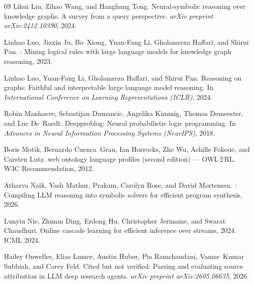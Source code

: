 \documentclass[11pt]{article}
\theoremstyle{plain}
\begin{document}
{\begin{thebibliography}{69}
Lihui Liu, Zihao Wang, and Hanghang Tong.
\newblock Neural-symbolic reasoning over knowledge graphs: A survey from a
  query perspective.
\newblock \emph{arXiv preprint arXiv:2412.10390}, 2024.

Linhao Luo, Jiaxin Ju, Bo~Xiong, Yuan-Fang Li, Gholamreza Haffari, and Shirui
  Pan.
: Mining logical rules with large language models for
  knowledge graph reasoning, 2023.

Linhao Luo, Yuan-Fang Li, Gholamreza Haffari, and Shirui Pan.
\newblock Reasoning on graphs: Faithful and interpretable large language model
  reasoning.
\newblock In \emph{International Conference on Learning Representations
  (ICLR)}, 2024.

Robin Manhaeve, Sebastijan Dumancic, Angelika Kimmig, Thomas Demeester, and Luc
  De~Raedt.
\newblock Deepproblog: Neural probabilistic logic programming.
\newblock In \emph{Advances in Neural Information Processing Systems
  (NeurIPS)}, 2018.

Boris Motik, Bernardo Cuenca~Grau, Ian Horrocks, Zhe Wu, Achille Fokoue, and
  Carsten Lutz.
 web ontology language profiles (second edition) ---
  {OWL\,2\,RL}.
\newblock W3C Recommendation, 2012.

Atharva Naik, Yash Mathur, {Prakam}, Carolyn Rose, and David Mortensen.
: Compiling {LLM} reasoning into symbolic solvers for
  efficient program synthesis, 2026.

Lunyiu Nie, Zhimin Ding, Erdong Hu, Christopher Jermaine, and Swarat Chaudhuri.
\newblock Online cascade learning for efficient inference over streams, 2024.
\newblock ICML 2024.

Hailey Onweller, Elias Lumer, Austin Huber, Pia Ramchandani, Vamse~Kumar
  Subbiah, and Corey Feld.
\newblock Cited but not verified: Parsing and evaluating source attribution in
  {LLM} deep research agents.
\newblock \emph{arXiv preprint arXiv:2605.06635}, 2026.


\end{thebibliography}}
\end{document}
